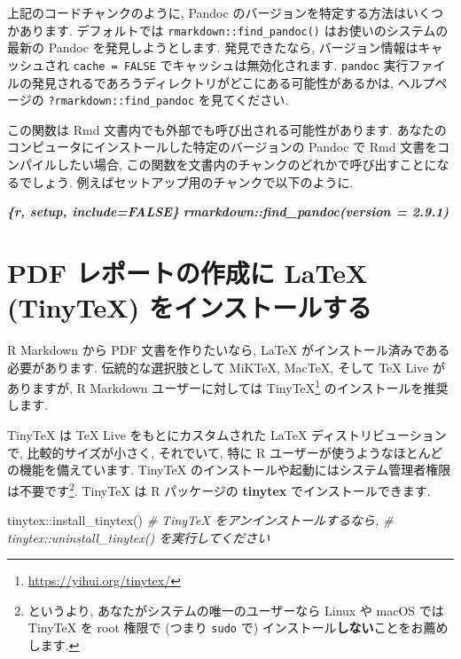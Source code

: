 \documentclass[
  11pt,
]{bxjsreport}
\newenvironment{Shaded}{\begin{snugshade}}{\end{snugshade}}
\newcommand{\CommentTok}[1]{\textcolor[rgb]{0.56,0.35,0.01}{\textit{#1}}}
\newcommand{\FunctionTok}[1]{\textcolor[rgb]{0.00,0.00,0.00}{#1}}
\newcommand{\InformationTok}[1]{\textcolor[rgb]{0.56,0.35,0.01}{\textbf{\textit{#1}}}}
\newcommand{\NormalTok}[1]{#1}
\newcommand{\SpecialCharTok}[1]{\textcolor[rgb]{0.00,0.00,0.00}{#1}}
\renewcommand{\href}[2]{#2\footnote{\url{#1}}}
\begin{document}
上記のコードチャンクのように, Pandoc のバージョンを特定する方法はいくつかあります. デフォルトでは \texttt{rmarkdown::find\_pandoc()} はお使いのシステムの最新の Pandoc を発見しようとします. 発見できたなら, バージョン情報はキャッシュされ \texttt{cache = FALSE} でキャッシュは無効化されます. \texttt{pandoc} 実行ファイルの発見されるであろうディレクトリがどこにある可能性があるかは, ヘルプページの \texttt{?rmarkdown::find\_pandoc} を見てください.

この関数は Rmd 文書内でも外部でも呼び出される可能性があります. あなたのコンピュータにインストールした特定のバージョンの Pandoc で Rmd 文書をコンパイルしたい場合, この関数を文書内のチャンクのどれかで呼び出すことになるでしょう. 例えばセットアップ用のチャンクで以下のように.

\begin{Shaded}
\begin{Highlighting}[]
\InformationTok{\textasciigrave{}\textasciigrave{}\textasciigrave{}\{r, setup, include=FALSE\}}
\InformationTok{rmarkdown::find\_pandoc(version = \textquotesingle{}2.9.1\textquotesingle{})}
\InformationTok{\textasciigrave{}\textasciigrave{}\textasciigrave{}}
\end{Highlighting}
\end{Shaded}

\hypertarget{install-latex}{%
\section{PDF レポートの作成に LaTeX (TinyTeX) をインストールする}\label{install-latex}}

R Markdown から PDF 文書を作りたいなら, LaTeX がインストール済みである必要があります. 伝統的な選択肢として MiKTeX, MacTeX, そして TeX Live がありますが, R Markdown ユーザーに対しては \href{https://yihui.org/tinytex/}{TinyTeX} のインストールを推奨します.

TinyTeX は TeX Live をもとにカスタムされた LaTeX ディストリビューションで, 比較的サイズが小さく, それでいて, 特に R ユーザーが使うようなほとんどの機能を備えています. TinyTeX のインストールや起動にはシステム管理者権限は不要です\footnote{というより, あなたがシステムの唯一のユーザーなら Linux や macOS では TinyTeX を root 権限で (つまり \texttt{sudo} で) インストール\textbf{しない}ことをお薦めします.}. TinyTeX は R パッケージの \textbf{tinytex} \autocite{R-tinytex} でインストールできます.

\begin{Shaded}
\begin{Highlighting}[numbers=left,,]
\NormalTok{tinytex}\SpecialCharTok{::}\FunctionTok{install\_tinytex}\NormalTok{()}
\CommentTok{\# TinyTeX をアンインストールするなら,}
\CommentTok{\# tinytex::uninstall\_tinytex() を実行してください}
\end{Highlighting}
\end{Shaded}
\end{document}
